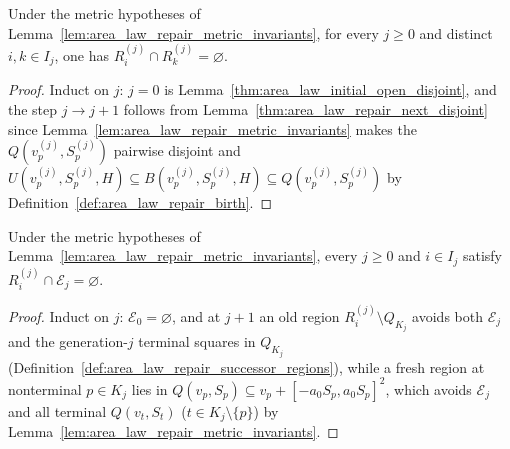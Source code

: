 \begin{lemma}
    \label{thm:area_law_repair_current_disjoint}
    \leanok
    Under the metric hypotheses of Lemma~\ref{lem:area_law_repair_metric_invariants}, for every
    $j\ge0$ and distinct $i,k\in I_j$, one has $R_i^{(j)}\cap R_k^{(j)}=\varnothing$.
\end{lemma}

\begin{proof}\leanok
    Induct on $j$: $j=0$ is Lemma~\ref{thm:area_law_initial_open_disjoint}, and the step $j\to j+1$
    follows from Lemma~\ref{thm:area_law_repair_next_disjoint} since
    Lemma~\ref{lem:area_law_repair_metric_invariants} makes the $Q(v_p^{(j)},S_p^{(j)})$ pairwise disjoint
    and $U(v_p^{(j)},S_p^{(j)},H)\subseteq B(v_p^{(j)},S_p^{(j)},H)\subseteq Q(v_p^{(j)},S_p^{(j)})$
    by Definition~\ref{def:area_law_repair_birth}.
\end{proof}

\begin{lemma}
    \label{thm:area_law_repair_current_terminal_disjoint}
    \leanok
    Under the metric hypotheses of Lemma~\ref{lem:area_law_repair_metric_invariants}, every
    $j\ge0$ and $i\in I_j$ satisfy $R_i^{(j)}\cap\mathcal E_j=\varnothing$.
\end{lemma}

\begin{proof}
    \leanok
    Induct on $j$: $\mathcal E_0=\varnothing$, and at $j+1$ an old region $R_i^{(j)}\setminus Q_{K_j}$
    avoids both $\mathcal E_j$ and the generation-$j$ terminal squares in $Q_{K_j}$
    (Definition~\ref{def:area_law_repair_successor_regions}), while a fresh region at nonterminal
    $p\in K_j$ lies in $Q(v_p,S_p)\subseteq v_p+[-a_0S_p,a_0S_p]^2$, which avoids $\mathcal E_j$ and
    all terminal $Q(v_t,S_t)$ ($t\in K_j\setminus\{p\}$) by Lemma~\ref{lem:area_law_repair_metric_invariants}.
\end{proof}

